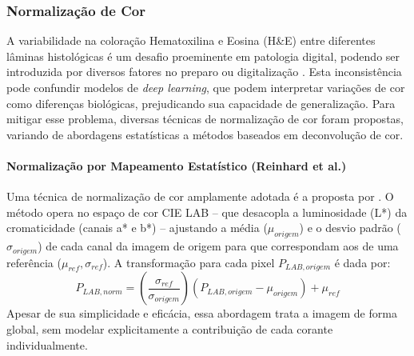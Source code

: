 \subsubsection{Normalização de Cor}\label{subsubsec:fund_norm_cor}

A variabilidade na coloração Hematoxilina e Eosina (H\&E) entre diferentes lâminas histológicas é um desafio proeminente em patologia digital, podendo ser introduzida por diversos fatores no preparo ou digitalização \cite{Xiong2021StainVariability}. Esta inconsistência pode confundir modelos de \textit{deep learning}, que podem interpretar variações de cor como diferenças biológicas, prejudicando sua capacidade de generalização. Para mitigar esse problema, diversas técnicas de normalização de cor foram propostas, variando de abordagens estatísticas a métodos baseados em deconvolução de cor.

\paragraph{Normalização por Mapeamento Estatístico (Reinhard et al.)}
Uma técnica de normalização de cor amplamente adotada é a proposta por \textcite{Reinhard2001}. O método opera no espaço de cor CIE LAB \cite{CIE2004} – que desacopla a luminosidade (L*) da cromaticidade (canais a* e b*) – ajustando a média ($\mu_{origem}$) e o desvio padrão ($\sigma_{origem}$) de cada canal da imagem de origem para que correspondam aos de uma referência ($\mu_{ref}, \sigma_{ref}$). A transformação para cada pixel $P_{LAB, origem}$ é dada por:
\begin{equation}\label{eq:reinhard_norm_fund}
    P_{LAB, norm} = \left( \frac{\sigma_{ref}}{\sigma_{origem}} \right) (P_{LAB, origem} - \mu_{origem}) + \mu_{ref}
\end{equation}
Apesar de sua simplicidade e eficácia, essa abordagem trata a imagem de forma global, sem modelar explicitamente a contribuição de cada corante individualmente.

